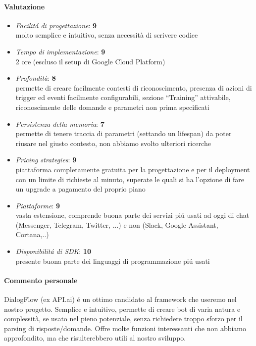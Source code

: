 \documentclass[]{article}
\begin{document}
\paragraph{Valutazione}
\begin{itemize}
\item \textit{Facilitá di progettazione}: \textbf{9} \\ molto semplice e intuitivo, senza necessità di scrivere codice

\item \textit{Tempo di implementazione}: \textbf{9} \\ 2 ore (escluso il setup di Google Cloud Platform)  

\item \textit{Profondità}: \textbf{8} \\  permette di creare facilmente contesti di riconoscimento, presenza di azioni di trigger ed eventi facilmente configurabili, sezione “Training” attivabile, riconoscimente delle domande e parametri non prima specificati
\item \textit{Persistenza della memoria}: \textbf{7} \\ permette di tenere traccia di parametri (settando un lifespan) da poter riusare nel giusto contesto, non abbiamo svolto ulteriori ricerche
\item \textit{Pricing strategies}: \textbf{9} \\ piattaforma completamente gratuita per la progettazione e per il deployment con un limite di richieste al minuto, superate le quali si ha l’opzione di fare un upgrade a pagamento del proprio piano

\item \textit{Piattaforme}: \textbf{9} \\ vasta estensione, comprende buona parte dei servizi piú usati ad oggi di chat (Messenger, Telegram, Twitter, ...) e non (Slack, Google Assistant, Cortana,..) 
\item \textit{Disponibilitá di SDK}: \textbf{10} \\  presente buona parte dei linguaggi di programmazione piú usati 
\end{itemize}

\paragraph{Commento personale}
DialogFlow (ex API.ai) é un ottimo candidato al framework che useremo nel nostro progetto. Semplice e intuitivo, permette di creare bot di varia natura e complessità, se usato nel pieno potenziale, senza richiedere troppo sforzo per il parsing di risposte/domande. Offre molte funzioni interessanti che non abbiamo approfondito, ma che risulterebbero utili al nostro sviluppo. 
\end{document}
